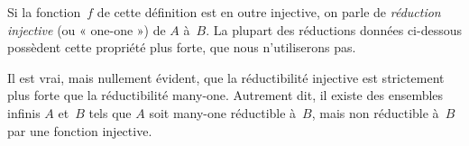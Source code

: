 \documentclass[../../../include/open-logic-section]{subfiles}
\begin{document}
Si la fonction~$f$ de cette définition est en outre
injective, on parle de \emph{réduction injective}
(ou « one-one ») de $A$ à~$B$. La plupart des
réductions données ci-dessous possèdent cette
propriété plus forte, que nous n'utiliserons pas.

\begin{digress}
Il est vrai, mais nullement évident, que la
réductibilité injective est strictement plus
forte que la réductibilité many-one. Autrement
dit, il existe des ensembles infinis $A$ et~$B$
tels que $A$ soit many-one réductible à~$B$,
mais non réductible à~$B$ par une fonction injective.
\end{digress}
\end{document}

